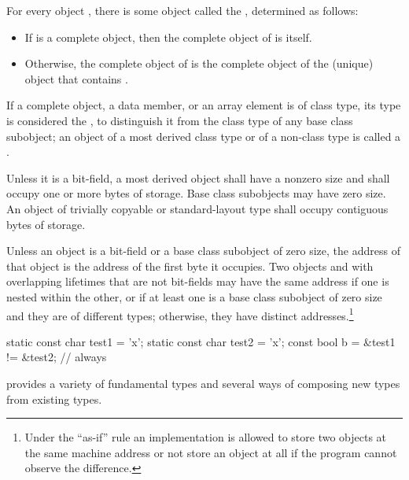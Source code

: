 \pnum
For every object , there is some object called the
 , determined as follows:
\begin{itemize}
\item
If  is a complete object, then the complete object
of  is itself.

\item
Otherwise, the complete object of  is the complete object
of the (unique) object that contains .
\end{itemize}

\pnum
If a complete object, a data member, or an array element is of
class type, its type is considered the , to distinguish it from the class type of any base class subobject;
an object of a most derived class type or of a non-class type is called a
.

\pnum
{}%
Unless it is a bit-field, a most derived object shall have a
nonzero size and shall occupy one or more bytes of storage. Base class
subobjects may have zero size. An object of trivially copyable or
standard-layout type shall occupy contiguous bytes of
storage.

\pnum
{}%
%
Unless an object is a bit-field or a base class subobject of zero size, the
address of that object is the address of the first byte it occupies.
Two objects  and 
with overlapping lifetimes
that are not bit-fields
may have the same address
if one is nested within the other,
or
if at least one is a base class subobject of zero size
and they are of different types;
otherwise, they have distinct addresses.\footnote{Under the ``as-if'' rule an
implementation is allowed to store two objects at the same machine address or
not store an object at all if the program cannot observe the
difference.}
\begin{example}
\begin{codeblock}
static const char test1 = 'x';
static const char test2 = 'x';
const bool b = &test1 != &test2;        // always 
\end{codeblock}
\end{example}

\pnum
\begin{note}
\Cpp{} provides a variety of fundamental types and several ways of composing
new types from existing types.
\end{note}%

